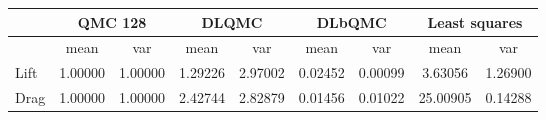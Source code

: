 \begin{tabular}{|l|c|c|c|c|c|c|c|c|}
\hline
 &\multicolumn{2}{c|}{\textbf{QMC 128}}&\multicolumn{2}{c|}{\textbf{DLQMC}}&\multicolumn{2}{c|}{\textbf{DLbQMC}}&\multicolumn{2}{c|}{\textbf{Least squares}}\\ 
\hline

 &mean&var&mean&var&mean&var&mean&var\\ 
\hline
Lift &1.00000&1.00000&1.29226&2.97002&0.02452&0.00099&3.63056&1.26900\\ 
\hline
Drag &1.00000&1.00000&2.42744&2.82879&0.01456&0.01022&25.00905&0.14288\\ 
\hline
\end{tabular}

